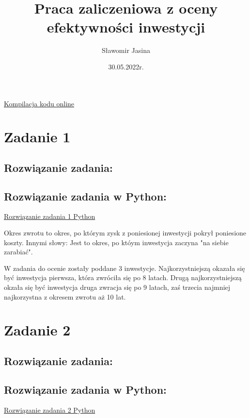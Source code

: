 \documentclass{article}
\title{Praca zaliczeniowa z oceny efektywności inwestycji}
\author{Sławomir Jasina}
\date{30.05.2022r.}
\begin{document}
	\maketitle
	\newpage
	\tableofcontents
	\newpage
	
	\href{https://github.com/slaw999999999/OEI/blob/main/README.md}{Kompilacja kodu online}
	
	
	\vspace*{1,1cm} 
	\section*{Zadanie 1}
	

	\subsection*{Rozwiązanie zadania:}
	
	
	\subsection*{Rozwiązanie zadania w Python:}
	\href{https://github.com/slaw999999999/OEI/blob/main/Zadanie1.ipynb}{Rozwiązanie zadania 1 Python}
	
	Okres zwrotu to okres, po którym zysk z poniesionej inwestycji pokrył poniesione koszty. Innymi słowy: Jest to okres, po któym inwestycja zaczyna "na siebie zarabiać". \newline
	
	
	
	W zadania do ocenie zostały poddane 3 inwestycje.	
	 Najkorzystniejszą okazała się być inwestycja pierwsza, która zwróciła się po 8 latach. Drugą najkorzystniejszą okzała się być inwestycja druga zwracja się po 9 latach, zaś trzecia najmniej najkorzystna z okresem zwrotu aż 10 lat.
	
	
	
	\newpage
	\section*{Zadanie 2}
	
	
	\subsection*{Rozwiązanie zadania:}
	
	
	\subsection*{Rozwiązanie zadania w Python:}
	\href{https://github.com/slaw999999999/OEI/blob/main/Zadanie1.ipynb}{Rozwiązanie zadania 2 Python}
	
\end{document}
